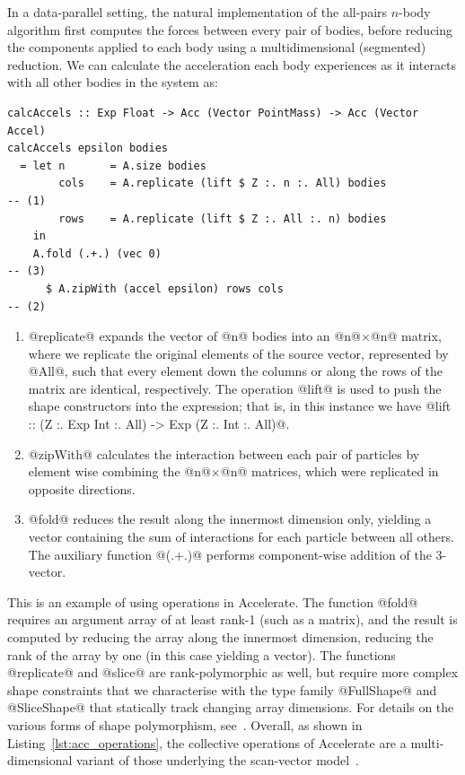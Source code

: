 In a data-parallel setting, the natural implementation of the all-pairs $n$-body
algorithm first computes the forces between every pair of bodies, before
reducing the components applied to each body using a multidimensional
(segmented) reduction. We can calculate the acceleration each body experiences
as it interacts with all other bodies in the system as:
%
\begin{lstlisting}[style=haskell]
calcAccels :: Exp Float -> Acc (Vector PointMass) -> Acc (Vector Accel)
calcAccels epsilon bodies
  = let n       = A.size bodies
        cols    = A.replicate (lift $ Z :. n :. All) bodies                        -- (1)
        rows    = A.replicate (lift $ Z :. All :. n) bodies
    in
    A.fold (.+.) (vec 0)                                                           -- (3)
      $ A.zipWith (accel epsilon) rows cols                                        -- (2)
\end{lstlisting}
%
\begin{enumerate}
\item @replicate@ expands the vector of @n@ bodies into an @n@$\times$@n@
    matrix, where we replicate the original elements of the source vector,
    represented by @All@, such that every element down the columns or along the
    rows of the matrix are identical, respectively. The operation @lift@ is used
    to push the shape constructors into the expression; that is, in this
    instance we have @lift :: (Z :. Exp Int :. All) -> Exp (Z :. Int :. All)@.

\item @zipWith@ calculates the interaction between each pair of particles by
    element wise combining the @n@$\times$@n@ matrices, which were replicated in
    opposite directions.

\item @fold@ reduces the result along the innermost dimension only, yielding a
    vector containing the sum of interactions for each particle between all
    others. The auxiliary function @(.+.)@ performs component-wise addition of
    the 3-vector.
\end{enumerate}

This is an example of using  operations in Accelerate.
The function @fold@ requires an argument array of at least rank-1 (such as a
matrix), and the result is computed by reducing the array along the innermost
dimension, reducing the rank of the array by one (in this case yielding a
vector). The functions @replicate@ and @slice@ are rank-polymorphic as well, but
require more complex shape constraints that we characterise with the type family
@FullShape@ and @SliceShape@ that statically track changing array dimensions.
For details on the various forms of shape polymorphism,
see~\citet{Keller:2010er}. Overall, as shown in
Listing~\ref{lst:acc_operations}, the collective operations of Accelerate are a
multi-dimensional variant of those underlying the scan-vector
model~\cite{Chatterjee:1990vj,Sengupta:2007tc}.


